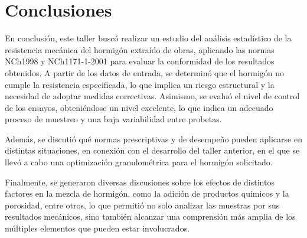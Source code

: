 \section{Conclusiones}

En conclusión, este taller buscó realizar un estudio del análisis estadístico de la resistencia mecánica del hormigón extraído de obras, aplicando las normas NCh1998 y NCh1171-1-2001 para evaluar la conformidad de los resultados obtenidos. A partir de los datos de entrada, se determinó que el hormigón no cumple la resistencia especificada, lo que implica un riesgo estructural y la necesidad de adoptar medidas correctivas. Asimismo, se evaluó el nivel de control de los ensayos, obteniéndose un nivel excelente, lo que indica un adecuado proceso de muestreo y una baja variabilidad entre probetas.

Además, se discutió qué normas prescriptivas y de desempeño pueden aplicarse en distintas situaciones, en conexión con el desarrollo del taller anterior, en el que se llevó a cabo una optimización granulométrica para el hormigón solicitado.

Finalmente, se generaron diversas discusiones sobre los efectos de distintos factores en la mezcla de hormigón, como la adición de productos químicos y la porosidad, entre otros, lo que permitió no solo analizar las muestras por sus resultados mecánicos, sino también alcanzar una comprensión más amplia de los múltiples elementos que pueden estar involucrados.